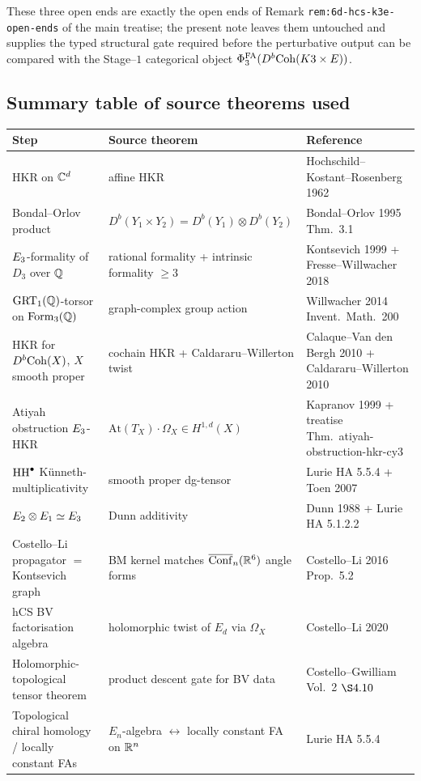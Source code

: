 These three open ends are exactly the open ends of
Remark \texttt{rem:6d-hcs-k3e-open-ends} of the main treatise; the
present note leaves them untouched and supplies the typed structural
gate required before the perturbative output can be compared with the
Stage--$1$ categorical object $\Phi^{\mathrm{FA}}_3(D^b\mathrm{Coh}(K3 \times E))$.

\subsection*{Summary table of source theorems used}
\label{sec:agent06-source-theorems}

\begin{center}
\small
\begin{tabular}{lll}
\toprule
Step & Source theorem & Reference \\
\midrule
HKR on $\mathbb C^d$ & affine HKR & Hochschild--Kostant--Rosenberg 1962 \\
Bondal--Orlov product & $D^b(Y_1 \times Y_2) = D^b(Y_1) \otimes D^b(Y_2)$ & Bondal--Orlov 1995 Thm.~3.1 \\
$E_3$-formality of $D_3$ over $\mathbb Q$ & rational formality + intrinsic formality $\geq 3$ & Kontsevich 1999 + Fresse--Willwacher 2018 \\
$\mathrm{GRT}_1(\mathbb Q)$-torsor on $\mathrm{Form}_3(\mathbb Q)$ & graph-complex group action & Willwacher 2014 Invent.\ Math.\ 200 \\
HKR for $D^b\mathrm{Coh}(X)$, $X$ smooth proper & cochain HKR + Caldararu--Willerton twist & Calaque--Van den Bergh 2010 + Caldararu--Willerton 2010 \\
Atiyah obstruction $E_3$-HKR & $\mathrm{At}(T_X) \cdot \Omega_X \in H^{1, d}(X)$ & Kapranov 1999 + treatise Thm.~atiyah-obstruction-hkr-cy3 \\
$\mathrm{HH}^\bullet$ K\"unneth-multiplicativity & smooth proper dg-tensor & Lurie HA 5.5.4 + Toen 2007 \\
$E_2 \otimes E_1 \simeq E_3$ & Dunn additivity & Dunn 1988 + Lurie HA 5.1.2.2 \\
Costello--Li propagator $=$ Kontsevich graph & BM kernel matches $\overline{\mathrm{Conf}}_n(\mathbb R^6)$ angle forms & Costello--Li 2016 Prop.~5.2 \\
hCS BV factorisation algebra & holomorphic twist of $E_d$ via $\Omega_X$ & Costello--Li 2020 \\
Holomorphic-topological tensor theorem & product descent gate for BV data & Costello--Gwilliam Vol.~2 $\S 4.10$ \\
Topological chiral homology / locally constant FAs & $E_n$-algebra $\leftrightarrow$ locally constant FA on $\mathbb R^n$ & Lurie HA 5.5.4 \\
\bottomrule
\end{tabular}
\end{center}

